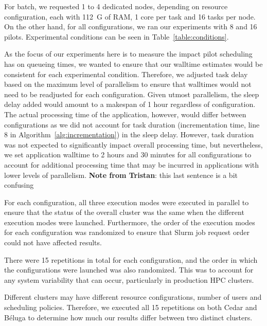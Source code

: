 \documentclass{IEEEtran}
\newcommand{\tristan}[1]{\color{red}\textbf{Note from Tristan}:
      #1 \color{black}}
\newcommand{\TG}[1]{\tristan{#1}}
\begin{document}
       For batch, we requested 1 to 4 dedicated nodes, depending on resource 
       configuration, each with 112~G of RAM, 1 core per task and 16 tasks per 
       node. On the other hand, for all configurations, we ran our experiments
       with 8 and 16 pilots. Experimental conditions can be seen in Table~\ref{table:conditions}.

       As the focus of our experiments here is to measure the impact pilot scheduling
       has on queueing times, we wanted to ensure that our walltime estimates would
       be consistent for each experimental condition. Therefore, we adjusted task 
       delay based on the maximum level of parallelism to ensure that walltimes would
       not need to be readjusted for each configuration. Given utmost parallelism,
       the sleep delay added would amount to a makespan of 1 hour regardless
       of configuration. The actual processing time of the application, however, 
       would differ between configurations as we did not account for task duration (incrementation time, line
       8 in Algorithm~\ref{alg:incrementation})
       in the sleep delay. However, task duration was not expected to significantly impact
       overall processing time, but nevertheless, we set application walltime to 
       2 hours and 30 minutes for all configurations to account for additional
       processing time that may be incurred in applications with lower levels of 
       parallelism. \TG{this last sentence is a bit confusing}

       For each configuration, all three execution modes were executed in parallel
       to ensure that the status of the overall cluster was the same when the 
       different execution modes were launched. Furthermore, the order of the execution modes
       for each configuration was randomized to ensure that Slurm job request
       order could not have affected results. 

       There were 15 repetitions in total for each configuration, and the order
       in which the configurations were launched was also randomized. This was to 
       account for any system variability that can occur, particularly in production
       HPC clusters. 

       Different clusters may have different resource configurations, number of 
       users and scheduling policies. Therefore, we executed all 15 repetitions on
       both Cedar and B\'eluga to determine how much our results differ between
       two distinct clusters.
\end{document}
